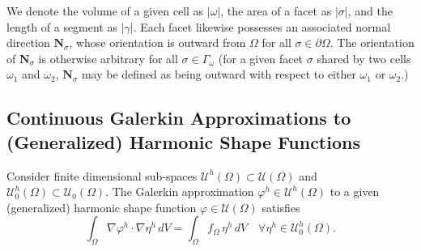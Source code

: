 	We denote the volume of a given cell as $|\omega|$, the area of a facet as $|\sigma|$, and the length of a segment as $|\gamma|$. Each facet likewise possesses an associated normal direction $\mathbf{N}_\sigma$, whose orientation is outward from $\Omega$ for all $\sigma \in \partial \Omega$. The orientation of $\mathbf{N}_\sigma$ is otherwise arbitrary for all $\sigma \in \Gamma_\omega$ (for a given facet $\sigma$ shared by two cells $\omega_1$ and $\omega_2$, $\mathbf{N}_\sigma$ may be defined as being outward with respect to either $\omega_1$ or $\omega_2$.)
	
\subsection*{Continuous Galerkin Approximations to \\ (Generalized) Harmonic Shape Functions}

	Consider finite dimensional sub-spaces $\mathcal{U}^h (\Omega) \subset \mathcal{U} (\Omega)$ and $\mathcal{U}^h_0 (\Omega) \subset \mathcal{U}_0 (\Omega)$. The Galerkin approximation $\varphi^h \in \mathcal{U}^h (\Omega)$ to a given (generalized) harmonic shape function $\varphi \in \mathcal{U} (\Omega)$ satisfies
	\begin{equation}
		\int_\Omega \nabla \varphi^h \cdot \nabla \eta^h \, dV = \int_\Omega f_{\Omega} \, \eta^h \, dV \quad \forall \eta^h \in \mathcal{U}^h_0 (\Omega).
		\label{eq:weak_poisson}
	\end{equation}

